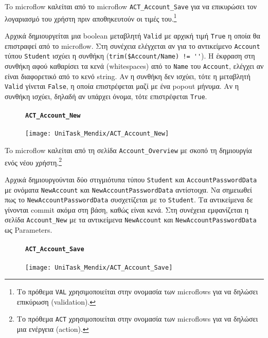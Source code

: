                     To microflow καλείται από το microflow \texttt{ACT\_Account\_Save} για να επικυρώσει τον λογαριασμό του χρήστη πριν αποθηκευτούν οι τιμές του.\footnote{Το πρόθεμα \texttt{VAL} χρησιμοποιείται στην ονομασία των microflows για να δηλώσει επικύρωση (validation).}

                    Αρχικά δημιουργείται μια boolean μεταβλητή \texttt{Valid} με αρχική τιμή \texttt{True} η οποία θα επιστραφεί από το microflow. Στη συνέχεια ελέγχεται αν για το αντικείμενο \texttt{Account} τύπου \texttt{Student} ισχύει η συνθήκη (\verb|trim($Account/Name) != ''|). Η έκφραση στη συνθήκη αφού καθαρίσει τα κενά (whitespaces) από το \texttt{Name} του \texttt{Account}, ελέγχει αν είναι διαφορετικό από το κενό string. Αν η συνθήκη δεν ισχύει, τότε η μεταβλητή \texttt{Valid} γίνεται \texttt{False}, η οποία επιστρέφεται μαζί με ένα popout μήνυμα. Αν η συνθήκη ισχύει, δηλαδή αν υπάρχει όνομα, τότε επιστρέφεται \texttt{True}.

                \begin{figure}[H] \noindent
                    \paragraph{\texttt{ACT\_Account\_New}}
                    \begin{center}
                        \texttt{[image: UniTask\_Mendix/ACT\_Account\_New]}
                    \end{center}
                \end{figure}

                    To microflow καλείται από τη σελίδα \texttt{Account\_Overview} με σκοπό τη δημιουργία ενός νέου χρήστη.\footnote{Το πρόθεμα \texttt{ACT} χρησιμοποιείται στην ονομασία των microflows για να δηλώσει μια ενέργεια (action).}

                    Αρχικά δημιουργούνται δύο στιγμιότυπα τύπου \texttt{Student} και \texttt{AccountPasswordData} με ονόματα \texttt{NewAccount} και \texttt{NewAccountPasswordData} αντίστοιχα. Να σημειωθεί πως το \texttt{NewAccountPasswordData} συσχετίζεται με το \texttt{Student}. Τα αντικείμενα δε γίνονται commit ακόμα στη βάση, καθώς είναι κενά. Στη συνέχεια εμφανίζεται η σελίδα \texttt{Account\_New} με τα αντικείμενα \texttt{NewAccount} και \texttt{NewAccountPasswordData} ως Parameters.

                \begin{figure}[H] \noindent
                    \paragraph{\texttt{ACT\_Account\_Save}}
                    \begin{center}
                        \texttt{[image: UniTask\_Mendix/ACT\_Account\_Save]}
                    \end{center}
                \end{figure}

